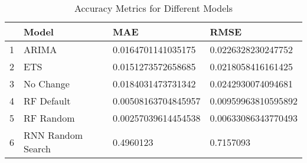 \begin{table}[ht]
\centering
\caption{Accuracy Metrics for Different Models} 
\begin{tabular}{rlll}
  \hline
 & Model & MAE & RMSE \\ 
  \hline
1 & ARIMA & 0.0164701141035175 & 0.0226328230247752 \\ 
  2 & ETS & 0.0151273572658685 & 0.0218058416161425 \\ 
  3 & No Change & 0.0184031473731342 & 0.0242930074094681 \\ 
  4 & RF Default & 0.00508163704845957 & 0.00959963810595892 \\ 
  5 & RF Random & 0.00257039614454538 & 0.00633086343770493 \\ 
  6 & RNN Random Search & 0.4960123 & 0.7157093 \\ 
   \hline
\end{tabular}
\end{table}
